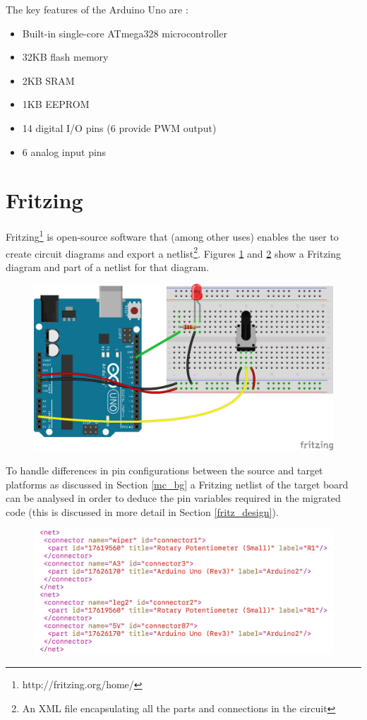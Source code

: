 \documentclass{UoYCSproject}
\begin{document}
The key features of the Arduino Uno are \parencite{arduinospec}:
\begin{itemize}
\item Built-in single-core ATmega328 microcontroller
\item 32KB flash memory
\item 2KB SRAM
\item 1KB EEPROM
\item 14 digital I/O pins (6 provide PWM output)
\item 6 analog input pins
\end{itemize}

\pagebreak
\section{Fritzing}
Fritzing\footnote{http://fritzing.org/home/} is open-source software that (among other uses) enables the user to create circuit diagrams and export a netlist\footnote{An XML file encapsulating all the parts and connections in the circuit}. Figures \ref{fig:fritz_graph} and \ref{fig:fritz_net} show a Fritzing diagram and part of a netlist for that diagram. 

 \begin{figure}[h!]
  \centering
  \includegraphics[width=0.6\linewidth]{graphics/fritzing_graphic.png}
  \label{fig:fritz_graph}
\end{figure}

To handle differences in pin configurations between the source and target platforms as discussed in Section \ref{mc_bg} a Fritzing netlist of the target board can be analysed in order to deduce the pin variables required in the migrated code (this is discussed in more detail in Section \ref{fritz_design}).

\begin{figure}[h!]
  \centering
  \includegraphics[width=0.8\linewidth]{graphics/fritzing_netlist.png}
  \label{fig:fritz_net}
\end{figure}
\end{document}
